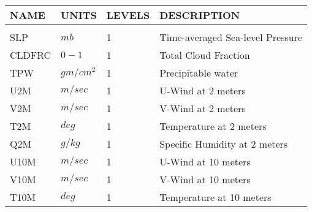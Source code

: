 \newpage
\vspace*{\fill}
\begin{tabular}{llll}
\hline\hline
 NAME & UNITS & LEVELS & DESCRIPTION \\
\hline

&\\
 SLP      &   $mb$  &    1
         &\begin{minipage}[t]{3in}
          {Time-averaged Sea-level Pressure}
         \end{minipage}\\
 CLDFRC  & $0-1$ &    1
         &\begin{minipage}[t]{3in}
          {Total Cloud Fraction} 
         \end{minipage}\\
 TPW     & $gm/cm^2$ &    1
         &\begin{minipage}[t]{3in}
          {Precipitable water} 
         \end{minipage}\\
 U2M     & $m/sec$ &    1
         &\begin{minipage}[t]{3in}
          {U-Wind at 2 meters}
         \end{minipage}\\
 V2M     & $m/sec$ &    1
         &\begin{minipage}[t]{3in}
          {V-Wind at 2 meters}
         \end{minipage}\\
 T2M     & $deg$ &    1
         &\begin{minipage}[t]{3in}
          {Temperature at 2 meters}
         \end{minipage}\\
 Q2M     & $g/kg$ &    1
         &\begin{minipage}[t]{3in}
          {Specific Humidity at 2 meters}
         \end{minipage}\\
 U10M    & $m/sec$ &    1
         &\begin{minipage}[t]{3in}
          {U-Wind at 10 meters}
         \end{minipage}\\
 V10M    & $m/sec$ &    1
         &\begin{minipage}[t]{3in}
          {V-Wind at 10 meters}
         \end{minipage}\\
 T10M    & $deg$ &    1
         &\begin{minipage}[t]{3in}
          {Temperature at 10 meters}

\end{minipage}
\end{tabular}
